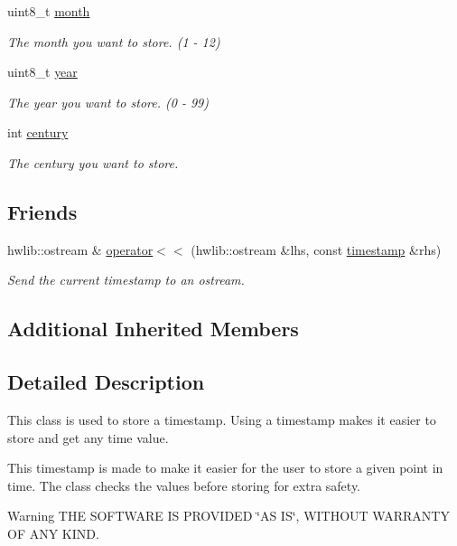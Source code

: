 \begin{DoxyCompactItemize}
\mbox{\label{classtimestamp_a71df69b7ebb5a6dd228f4ae70b954505}} 
uint8\+\_\+t \mbox{\hyperlink{classtimestamp_a71df69b7ebb5a6dd228f4ae70b954505}{month}}
\begin{DoxyCompactList}\small\item\em The month you want to store. (1 -\/ 12) \end{DoxyCompactList}\item 
uint8\+\_\+t \mbox{\hyperlink{classtimestamp_a6df342bdd1101cf67f9a4831d5372d58}{year}}
\begin{DoxyCompactList}\small\item\em The year you want to store. (0 -\/ 99) \end{DoxyCompactList}\item 
int \mbox{\hyperlink{classtimestamp_afe83888ffa38c1615a3d12b012f235b3}{century}}
\begin{DoxyCompactList}\small\item\em The century you want to store. \end{DoxyCompactList}\end{DoxyCompactItemize}
\subsection*{Friends}
\begin{DoxyCompactItemize}
\item 
hwlib\+::ostream \& \mbox{\hyperlink{classtimestamp_a0625abe0748dbab228b73920dfc33c4c}{operator$<$$<$}} (hwlib\+::ostream \&lhs, const \mbox{\hyperlink{classtimestamp}{timestamp}} \&rhs)
\begin{DoxyCompactList}\small\item\em Send the current timestamp to an ostream. \end{DoxyCompactList}\end{DoxyCompactItemize}
\subsection*{Additional Inherited Members}


\subsection{Detailed Description}
This class is used to store a timestamp. Using a timestamp makes it easier to store and get any time value. 

This timestamp is made to make it easier for the user to store a given point in time. The class checks the values before storing for extra safety. \begin{DoxyWarning}{Warning}
T\+HE S\+O\+F\+T\+W\+A\+RE IS P\+R\+O\+V\+I\+D\+ED \char`\"{}\+A\+S I\+S\char`\"{}, W\+I\+T\+H\+O\+UT W\+A\+R\+R\+A\+N\+TY OF A\+NY K\+I\+ND. 
\end{DoxyWarning}


